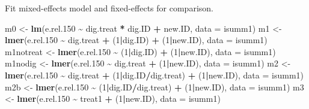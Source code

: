 \documentclass[
]{article}
\newenvironment{Shaded}{\begin{snugshade}}{\end{snugshade}}
\newcommand{\AttributeTok}[1]{\textcolor[rgb]{0.13,0.29,0.53}{#1}}
\newcommand{\DecValTok}[1]{\textcolor[rgb]{0.00,0.00,0.81}{#1}}
\newcommand{\FloatTok}[1]{\textcolor[rgb]{0.00,0.00,0.81}{#1}}
\newcommand{\FunctionTok}[1]{\textcolor[rgb]{0.13,0.29,0.53}{\textbf{#1}}}
\newcommand{\NormalTok}[1]{#1}
\newcommand{\OtherTok}[1]{\textcolor[rgb]{0.56,0.35,0.01}{#1}}
\newcommand{\SpecialCharTok}[1]{\textcolor[rgb]{0.81,0.36,0.00}{\textbf{#1}}}
\begin{document}
Fit mixed-effects model and fixed-effects for comparison.

\begin{Shaded}
\begin{Highlighting}[]
\NormalTok{m0 }\OtherTok{\textless{}{-}} \FunctionTok{lm}\NormalTok{(e.rel}\FloatTok{.150} \SpecialCharTok{\textasciitilde{}}\NormalTok{ dig.treat }\SpecialCharTok{*}\NormalTok{ dig.ID }\SpecialCharTok{+}\NormalTok{ new.ID, }\AttributeTok{data =}\NormalTok{ isumm1)}
\NormalTok{m1 }\OtherTok{\textless{}{-}} \FunctionTok{lmer}\NormalTok{(e.rel}\FloatTok{.150} \SpecialCharTok{\textasciitilde{}}\NormalTok{ dig.treat }\SpecialCharTok{+}\NormalTok{ (}\DecValTok{1}\SpecialCharTok{|}\NormalTok{dig.ID) }\SpecialCharTok{+}\NormalTok{ (}\DecValTok{1}\SpecialCharTok{|}\NormalTok{new.ID), }\AttributeTok{data =}\NormalTok{ isumm1)}
\NormalTok{m1notreat }\OtherTok{\textless{}{-}} \FunctionTok{lmer}\NormalTok{(e.rel}\FloatTok{.150} \SpecialCharTok{\textasciitilde{}}\NormalTok{ (}\DecValTok{1}\SpecialCharTok{|}\NormalTok{dig.ID) }\SpecialCharTok{+}\NormalTok{ (}\DecValTok{1}\SpecialCharTok{|}\NormalTok{new.ID), }\AttributeTok{data =}\NormalTok{ isumm1)}
\NormalTok{m1nodig }\OtherTok{\textless{}{-}} \FunctionTok{lmer}\NormalTok{(e.rel}\FloatTok{.150} \SpecialCharTok{\textasciitilde{}}\NormalTok{ dig.treat }\SpecialCharTok{+}\NormalTok{ (}\DecValTok{1}\SpecialCharTok{|}\NormalTok{new.ID), }\AttributeTok{data =}\NormalTok{ isumm1)}
\NormalTok{m2 }\OtherTok{\textless{}{-}} \FunctionTok{lmer}\NormalTok{(e.rel}\FloatTok{.150} \SpecialCharTok{\textasciitilde{}}\NormalTok{ dig.treat }\SpecialCharTok{+}\NormalTok{ (}\DecValTok{1}\SpecialCharTok{|}\NormalTok{dig.ID}\SpecialCharTok{/}\NormalTok{dig.treat) }\SpecialCharTok{+}\NormalTok{ (}\DecValTok{1}\SpecialCharTok{|}\NormalTok{new.ID), }\AttributeTok{data =}\NormalTok{ isumm1)}
\NormalTok{m2b }\OtherTok{\textless{}{-}} \FunctionTok{lmer}\NormalTok{(e.rel}\FloatTok{.150} \SpecialCharTok{\textasciitilde{}}\NormalTok{ (}\DecValTok{1}\SpecialCharTok{|}\NormalTok{dig.ID}\SpecialCharTok{/}\NormalTok{dig.treat) }\SpecialCharTok{+}\NormalTok{ (}\DecValTok{1}\SpecialCharTok{|}\NormalTok{new.ID), }\AttributeTok{data =}\NormalTok{ isumm1)}
\NormalTok{m3 }\OtherTok{\textless{}{-}} \FunctionTok{lmer}\NormalTok{(e.rel}\FloatTok{.150} \SpecialCharTok{\textasciitilde{}}\NormalTok{ treat1 }\SpecialCharTok{+}\NormalTok{ (}\DecValTok{1}\SpecialCharTok{|}\NormalTok{new.ID), }\AttributeTok{data =}\NormalTok{ isumm1)}
\end{Highlighting}
\end{Shaded}
\end{document}
